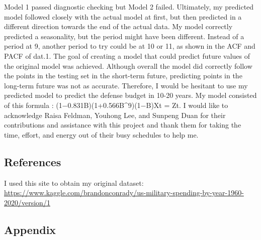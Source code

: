 \documentclass[
]{article}
\begin{document}
Model 1 passed diagnostic checking but Model 2 failed. Ultimately, my
predicted model followed closely with the actual model at first, but
then predicted in a different direction towards the end of the actual
data. My model correctly predicted a seasonality, but the period might
have been different. Instead of a period at 9, another period to try
could be at 10 or 11, as shown in the ACF and PACF of dat.1. The goal of
creating a model that could predict future values of the original model
was achieved. Although overall the model did correctly follow the points
in the testing set in the short-term future, predicting points in the
long-term future was not as accurate. Therefore, I would be hesitant to
use my predicted model to predict the defense budget in 10-20 years. My
model consisted of this formula : (1−0.831B)(1+0.566B\^{}9)(1−B)Xt = Zt.
I would like to acknowledge Raisa Feldman, Youhong Lee, and Sunpeng Duan
for their contributions and assistance with this project and thank them
for taking the time, effort, and energy out of their busy schedules to
help me.

\hypertarget{references}{%
\subsection{References}\label{references}}

I used this site to obtain my original dataset:
\url{https://www.kaggle.com/brandonconrady/us-military-spending-by-year-1960-2020/version/1}

\hypertarget{appendix}{%
\subsection{Appendix}\label{appendix}}
\end{document}
